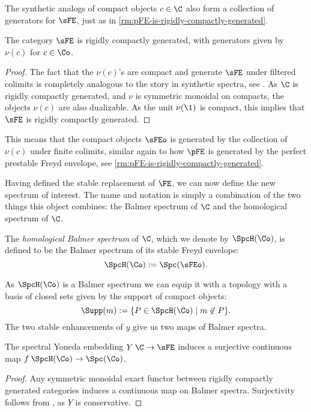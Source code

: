 The synthetic analogs of compact objects $c\in \C$ also form a collection of generators for $\sFE$, just as in \cref{rm:pFE-is-rigidly-compactly-generated}. 

\begin{lemma}
    The category $\sFE$ is rigidly compactly generated, with generators given by $\nu (c)$ for $c\in \Co$. 
\end{lemma}
\begin{proof}
    The fact that the $\nu(c)$'s are compact and generate $\sFE$ under filtered colimits is completely analogous to the story in synthetic spectra, see \cite[4.14]{pstragowski_2022}. As $\C$ is rigidly compactly generated, and $\nu$ is symmetric monoidal on compacts, the objects $\nu(c)$ are also dualizable. As the unit $\nu(\1)$ is compact, this implies that $\sFE$ is rigidly compactly generated. 
\end{proof}

\begin{remark}
    This means that the compact objects $\sFEo$ is generated by the collection of $\nu(c)$ under finite colimits, similar again to how $\pFE$ is generated by the perfect prestable Freyd envelope, see \cref{rm:pFE-is-rigidly-compactly-generated}. 
\end{remark}








Having defined the stable replacement of $\FE$, we can now define the new spectrum of interest. The name and notation is simply a combination of the two things this object combines: the Balmer spectrum of $\C$ and the homological spectrum of $\C$. 

\begin{definition}
    \label{def:homological-Balmer-spectrum}
    The \emph{homological Balmer spectrum} of $\C$, which we denote by $\SpcH(\Co)$, is defined to be the Balmer spectrum of its stable Freyd envelope: 
    \[\SpcH(\Co):= \Spc(\sFEo).\] 
\end{definition}

As $\SpcH(\Co)$ is a Balmer spectrum we can equip it with a topology with a basis of closed sets given by the support of compact objects: 
\[\Supp(m) := \{P\in \SpcH(\Co)\mid m\not\in P\}.\]
The two stable enhancements of $y$ give us two maps of Balmer spectra. 

\begin{proposition}
    \label{prop:spectral-yoneda-surjective}
    The spectral Yoneda embedding $Y\: \C\to \sFE$ induces a surjective continuous map $f\: \SpcH(\Co)\to \Spc(\Co)$. 
\end{proposition}
\begin{proof}
    Any symmetric monoidal exact functor between rigidly compactly generated categories induces a continuous map on Balmer spectra. Surjectivity follows from \cite[1.4]{barthel_castellana_heard_sanders_2024}, as $Y$ is conservative. 
\end{proof}

